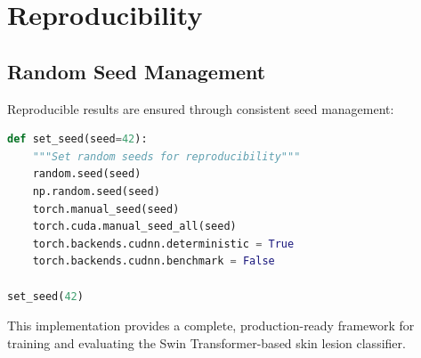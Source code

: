 \section{Reproducibility}

\subsection{Random Seed Management}

Reproducible results are ensured through consistent seed management:

\begin{lstlisting}[language=Python, caption=Seed Configuration]
def set_seed(seed=42):
    """Set random seeds for reproducibility"""
    random.seed(seed)
    np.random.seed(seed)
    torch.manual_seed(seed)
    torch.cuda.manual_seed_all(seed)
    torch.backends.cudnn.deterministic = True
    torch.backends.cudnn.benchmark = False

set_seed(42)
\end{lstlisting}

This implementation provides a complete, production-ready framework for training and evaluating the Swin Transformer-based skin lesion classifier.
